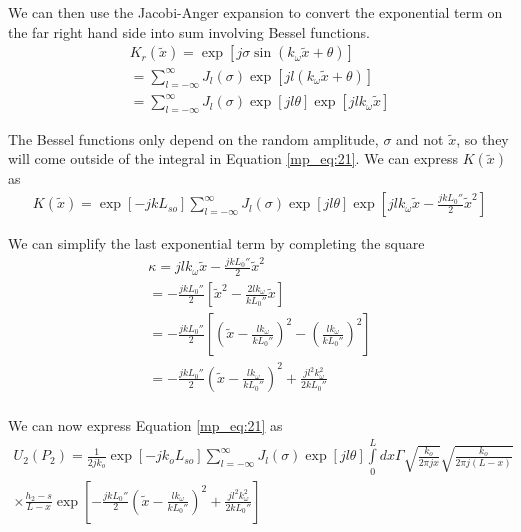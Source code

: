 We can then use the Jacobi-Anger expansion \cite{gbur_math} to convert the exponential term on the far right hand side into sum involving Bessel functions.
\begin{equation}
\begin{gathered}
K_r(\tilde{x}) =\exp\left[j\sigma \sin\left(k_{\omega} \tilde{x} + \theta\right) \right] \\ =\sum_{l=-\infty}^{\infty}J_l(\sigma)\exp\left[jl(k_{\omega}\tilde{x} + \theta) \right] \\
=\sum_{l=-\infty}^{\infty}J_l(\sigma)\exp\left[jl\theta\right]\exp\left[jlk_{\omega}\tilde{x}\right] 
\end{gathered}
\label{mp_eq:31}
\end{equation}
\renewcommand{\baselinestretch}{2} \small\normalsize

The Bessel functions only depend on the random amplitude, $\sigma$ and not $\tilde{x}$, so they will come outside of the integral in Equation \ref{mp_eq:21}. We can express $K(\tilde{x})$ as
\begin{equation}
\begin{gathered}
K(\tilde{x}) = \exp\left[-jkL_{so}\right]\sum_{l=-\infty}^{\infty}J_l(\sigma)\exp\left[jl\theta\right]\exp\left[jlk_{\omega}\tilde{x}-\frac{jkL_0''}{2}\tilde{x}^2\right] 
\end{gathered}
\label{mp_eq:32}
\end{equation}
\renewcommand{\baselinestretch}{2} \small\normalsize

We can simplify the last exponential term by completing the square
\begin{equation}
\begin{gathered}
\kappa = jlk_{\omega}\tilde{x}-\frac{jkL_0''}{2}\tilde{x}^2\\
= -\frac{jkL_0''}{2}\left[\tilde{x}^2 - \frac{2lk_{\omega}}{kL_0''}\tilde{x} \right]\\
= -\frac{jkL_0''}{2}\left[\left(\tilde{x} - \frac{lk_{\omega}}{kL_0''} \right)^2 -\left(\frac{lk_{\omega}}{kL_0''} \right)^2\right]\\
= -\frac{jkL_0''}{2}\left(\tilde{x} - \frac{lk_{\omega}}{kL_0''} \right)^2 + \frac{jl^2k_{\omega}^2}{2kL_0''}\\
\end{gathered}
\label{mp_eq:33}
\end{equation}
\renewcommand{\baselinestretch}{2} \small\normalsize

We can now express Equation \ref{mp_eq:21} as
\begin{equation}
\begin{gathered}
U_2(P_2)= \frac{1}{2jk_o}\exp\left[-jk_oL_{so}\right]\sum_{l=-\infty}^{\infty}J_l(\sigma)\exp\left[jl\theta\right]\int\limits_{0}^{L}dx\Gamma \sqrt{\frac{k_o}{2\pi jx}}\sqrt{\frac{k_o}{2\pi j (L-x)}}\\ \times\frac{h_2-s}{L-x}\exp\left[-\frac{jkL_0''}{2}\left(\tilde{x} - \frac{lk_{\omega}}{kL_0''} \right)^2 + \frac{jl^2k_{\omega}^2}{2kL_0''}\right]
\label{mp_eq:34}
\end{gathered}
\end{equation}
\renewcommand{\baselinestretch}{2} \small\normalsize


